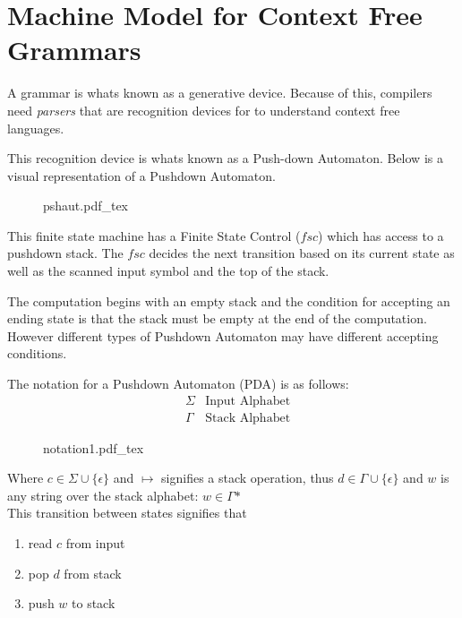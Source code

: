 \documentclass[12pt]{book}
\title{\coursetitle\linebreak\lecturename}
\author{\\Cain Susko\\ 
           \\ \\ \\
      Queen's University 
    \\School of Computing\\}
\newcommand{\incfig}[1]{%
    {#1.pdf_tex}
}
\begin{document}
\begin{titlepage}
        \maketitle
\end{titlepage}


\section*{Machine Model for Context Free Grammars}
A grammar is whats known as a generative device. 
Because of this, compilers need \textit{parsers} that are recognition devices for to understand context free languages.

This recognition device is whats known as a Push-down Automaton. Below is a visual representation of a Pushdown Automaton.
\begin{figure}[h]
        \centering
        \incfig{pshaut}
\end{figure}

This finite state machine has a Finite State Control ($fsc$) which has access to a pushdown stack.
The  $fsc$ decides the next transition based on its current state as well as the scanned input symbol and the top of the stack.
 
The computation begins with an empty stack and the condition for accepting an ending state is that the stack must be empty at the end
        of the computation. However different types of Pushdown Automaton may have different accepting conditions.
\pagebreak


The notation for a Pushdown Automaton (PDA) is as follows:
\begin{align*}
        &\Sigma &\text{Input Alphabet}\\
        &\Gamma &\text{Stack Alphabet}
\end{align*}
\begin{figure}[h]
        \centering 
        \incfig{notation1}
\end{figure}

Where $c\in \Sigma\cup\{\epsilon\}$ and  $\mapsto$ signifies a stack operation, thus  $d\in\Gamma\cup\{\epsilon\}$ and  
        $w$ is any string over the stack alphabet: $w\in\Gamma\text{*}$\\
This transition between states signifies that
\begin{enumerate}
        \item read $c$ from input
        \item pop  $d$ from stack
        \item push  $w$ to stack
\end{enumerate}
\end{document}
